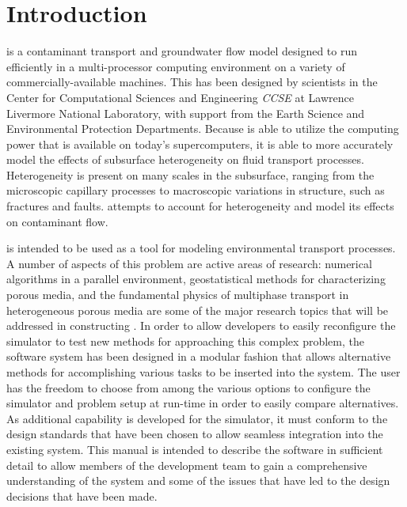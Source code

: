 
\chapter{Introduction}
\label{Introduction}

\parflow{} is a contaminant transport and groundwater flow model
designed to run efficiently in a multi-processor computing environment
on a variety of commercially-available machines.
This has been designed by scientists in the Center for Computational
Sciences and Engineering {\em CCSE} at Lawrence Livermore National
Laboratory, with support from the Earth Science and Environmental
Protection Departments.
Because \parflow{} is able to utilize the computing power that is
available on today's supercomputers, it is able to more accurately model
the effects of subsurface heterogeneity on fluid transport processes.
Heterogeneity is present on many scales in the subsurface, ranging
from the microscopic capillary processes to macroscopic variations in
structure, such as fractures and faults.
\parflow{} attempts to account for heterogeneity and model its
effects on contaminant flow.

\parflow{} is intended to be used as a tool for modeling
environmental transport processes.
A number of aspects of this problem are active areas of research:
numerical algorithms in a parallel environment, geostatistical
methods for characterizing porous media, and the fundamental
physics of multiphase transport in heterogeneous porous media are
some of the major research topics that will be addressed in
constructing \parflow{}.
In order to allow developers to easily reconfigure the \parflow{}
simulator to test new methods for approaching this complex problem,
the software system has been designed in a modular fashion that allows
alternative methods for accomplishing various tasks to be inserted
into the system.
The user has the freedom to choose from among the various options to
configure the simulator and problem setup at run-time in order to
easily compare alternatives.
As additional capability is developed for the \parflow{} simulator,
it must conform to the design standards that have been chosen to allow
seamless integration into the existing system.
This manual is intended to describe the \parflow{} software in sufficient
detail to allow members of the \parflow{} development team to
gain a comprehensive understanding of the \parflow{} system
and some of the issues that have led to the design decisions that
have been made.


